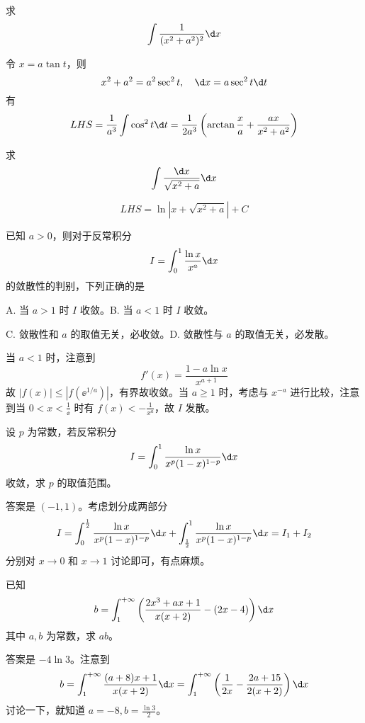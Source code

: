 \begin{problem}[000014]
求
\[ \int \frac{1}{(x^2+a^2)^2} \d x \]
\end{problem}
\begin{solution}
	令 $x = a \tan t$，则
	\[ x^2 + a^2 = a^2 \sec^2 t, \quad \d x = a \sec^2 t \d t \]
	有
	\[ LHS =  \frac{1}{a^3}\int \cos^2 t \d t = \frac{1}{2a^3} \left( \arctan \frac{x}{a} + \frac{ax}{x^2+a^2} \right) \]
\end{solution}


\begin{problem}[000015]
求
\[ \int \frac{\d x}{\sqrt{x^2 + a}} \d x \]
\end{problem}
\begin{solution}
	\[ LHS =  \ln |x + \sqrt{x^2+a}| + C \]
\end{solution}


\begin{problem}[000027]
已知 $a > 0$，则对于反常积分
\[ I = \int_{0}^{1} \frac{\ln x}{x^a} \d x \]
的敛散性的判别，下列正确的是

A. 当 $a > 1$ 时 $I$ 收敛。B. 当 $a < 1$ 时 $I$ 收敛。

C. 敛散性和 $a$ 的取值无关，必收敛。D. 敛散性与 $a$ 的取值无关，必发散。
\end{problem}
\begin{solution}
	当 $a < 1$ 时，注意到
	\[ f'(x) = \frac{1 - a \ln x}{x^{a+1}} \]
	故 $|f(x)| \leqslant |f(\ee^{1/a})|$，有界故收敛。当 $a \geqslant 1$ 时，考虑与 $x^{-a}$ 进行比较，注意到当 $0 < x < \frac{1}{\ee}$ 时有 $f(x) < -\frac{1}{x^a}$，故 $I$ 发散。
\end{solution}

\begin{problem}[000028]
设 $p$ 为常数，若反常积分
\[ I = \int_{0}^{1} \frac{\ln x}{x^p(1-x)^{1-p}} \d x \]
收敛，求 $p$ 的取值范围。
\end{problem}
\begin{solution}
	答案是 $(-1,1)$。考虑划分成两部分
	\[ I = \int_{0}^{\frac{1}{2}} \frac{\ln x}{x^p(1-x)^{1-p}} \d x + \int_{\frac{1}{2}}^{1} \frac{\ln x}{x^p(1-x)^{1-p}} \d x = I_1 + I_2 \]
	分别对 $x \to 0$ 和 $x \to 1$ 讨论即可，有点麻烦。
\end{solution}

\begin{problem}[000029]
已知
\[ b = \int_{1}^{+\infty} \left(\frac{2x^3 + ax + 1}{x(x+2)} - (2x-4)\right) \d x \]
其中 $a,b$ 为常数，求 $ab$。
\end{problem}
\begin{solution}
	答案是 $-4 \ln 3$。注意到
	\[ b = \int_{1}^{+\infty} \frac{(a+8)x+1}{x(x+2)} \d x= \int_{1}^{+\infty} \left(\frac{1}{2x} - \frac{2a+15}{2(x+2)}\right) \d x \]
	讨论一下，就知道 $a = -8, b = \frac{\ln 3}{2} $。
\end{solution}

